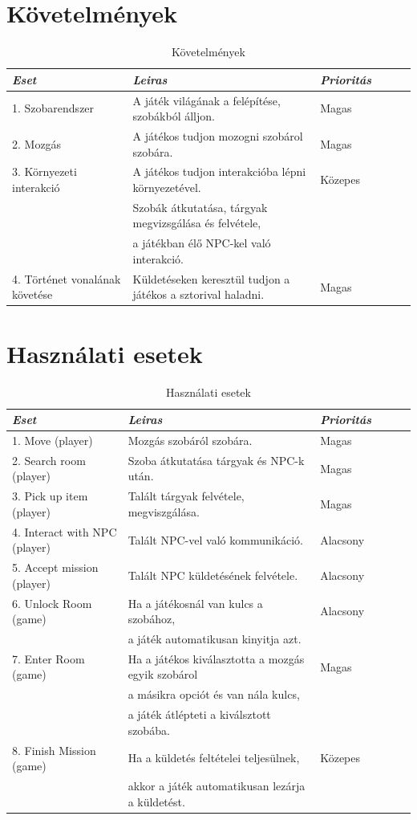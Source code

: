 \documentclass{scrarticle}
\begin{document}
\section{Követelmények}
\begin{table}[H] \centering
    \caption{Követelmények}\label{tab:requirements}
    \begin{tabular}{@{}ll@{}ll@{}ll}
        \emph{Eset} & \emph{Leiras} & \emph{Prioritás}\\ \hline
        1. Szobarendszer & A játék világának a felépítése, szobákból álljon. & Magas\\
        2. Mozgás & A játékos tudjon mozogni szobárol szobára. & Magas\\
        3. Környezeti interakció & A játékos tudjon interakcióba lépni környezetével. & Közepes\\ & Szobák átkutatása, tárgyak megvizsgálása és felvétele,\\ & a játékban élő NPC-kel való interakció.\\
        4. Történet vonalának követése & Küldetéseken keresztül tudjon a játékos a sztorival haladni. & Magas\\
    \end{tabular}
\end{table}

\section{Használati esetek}
\begin{table}[H] \centering
    \caption{Használati esetek}\label{tab:usecasetable}
    \begin{tabular}{@{}ll@{}ll@{}ll}
        \emph{Eset} & \emph{Leiras} & \emph{Prioritás}\\ \hline
        1. Move (player)         & Mozgás szobáról szobára. & Magas\\
        2. Search room (player)  & Szoba átkutatása tárgyak és NPC-k után. & Magas\\
        3. Pick up item (player) & Talált tárgyak felvétele, megviszgálása. & Magas\\
        4. Interact with NPC (player) & Talált NPC-vel való kommunikáció. & Alacsony\\
        5. Accept mission (player) & Talált NPC küldetésének felvétele. & Alacsony\\ 
        6. Unlock Room (game) & Ha a játékosnál van kulcs a szobához, & Alacsony\\ & a játék automatikusan kinyitja azt.\\
        7. Enter Room (game) & Ha a játékos kiválasztotta a mozgás egyik szobárol & Magas\\ & a másikra opciót és van nála kulcs,\\ & a játék átlépteti a kiválsztott szobába.\\
        8. Finish Mission (game) & Ha a küldetés feltételei teljesülnek, & Közepes\\ & akkor a játék automatikusan lezárja a küldetést.\\ 
    \end{tabular}
\end{table}
\end{document}
